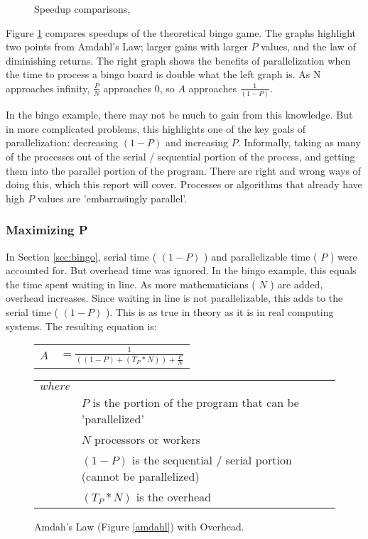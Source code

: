 \begin{figure}[h]
	\begin{center}
		\caption{Speedup comparisons,} 
		\label{amdahl_graph}
	\end{center}
\end{figure}

Figure \ref{amdahl_graph} compares speedups of the theoretical bingo game. The graphs highlight two points
from Amdahl's Law; larger gains with larger $ P $ values, and the law of diminishing returns. The right graph
shows the benefits of parallelization when the time to process a bingo board is double what the left graph is.
As N approaches infinity, $ \frac{P}{N} $ approaches 0, so $ A $ approaches $\frac{1}{(1 - P)} $. 

In the bingo example, there may not be much to gain from this knowledge. But in more complicated problems,
this highlights one of the key goals of parallelization: decreasing $ (1 - P) $ and increasing $ P $. Informally,
taking as many of the processes out of the serial / sequential portion of the process, and getting them into
the parallel portion of the program. There are right and wrong ways of doing this, which this report will cover.
Processes or algorithms that already have high $ P $ values are 'embarrasingly parallel'.

\subsubsection{Maximizing P}
In Section \ref{sec:bingo}, serial time ( $ (1 - P) $ ) and parallelizable time ( $ P $ ) were accounted for. But 
overhead time was ignored. In the bingo example, this equals the time spent waiting in line. As more 
mathematicians ( $ N $ ) are added, overhead increases. Since waiting in line is not parallelizable, this adds 
to the serial time ( $ (1 - P) $ ). This is as true in theory as it is in real computing systems. The resulting 
equation is:

\begin{figure}[h]
	\begin{center}
		\LARGE
		\begin{tabular}{l r}
			$ A $		&	$ = \frac{1}{((1 - P) + (T_P * N)) + \frac{P}{N}} $ \\
		\end{tabular}

		\normalsize
		\begin{tabular}{l l}
			$ where $  & \\
					&	$ P $ is the portion of the program that can be 'parallelized' \\
					&	$ N $ processors or workers \\
					&	$ (1 - P) $ is the sequential / serial portion (cannot be parallelized) \\
					&	$ (T_P * N) $ is the overhead \\
		\end{tabular}
		\caption{Amdah's Law (Figure \ref{amdahl}) with Overhead. } 
		\label{amdahl_overhead}
	\end{center}
\end{figure}
\normalsize

